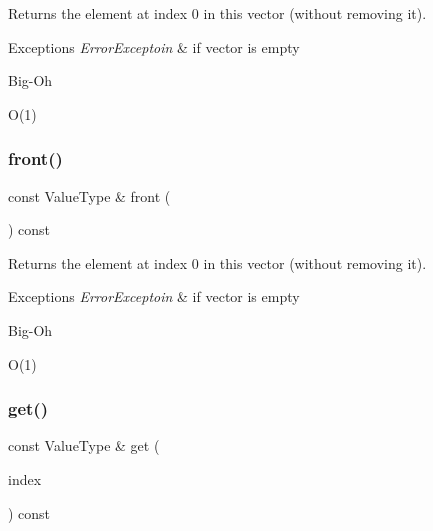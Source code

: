 Returns the element at index 0 in this vector (without removing it). 


\begin{DoxyExceptions}{Exceptions}
{\em Error\+Exceptoin} & if vector is empty \\
\hline
\end{DoxyExceptions}
\begin{DoxyRefDesc}{Big-\/\+Oh}
\item[\mbox{\hyperlink{BigOh__BigOh000112}{Big-\/\+Oh}}]O(1) \end{DoxyRefDesc}
\mbox{\label{classVector_a02aaa52ad7a120201f6dd3e90eff737f}} 
\subsubsection{\texorpdfstring{front()}{front()}\hspace{0.1cm}{\footnotesize\ttfamily [2/2]}}
{\footnotesize\ttfamily const Value\+Type \& front (\begin{DoxyParamCaption}{ }\end{DoxyParamCaption}) const}



Returns the element at index 0 in this vector (without removing it). 


\begin{DoxyExceptions}{Exceptions}
{\em Error\+Exceptoin} & if vector is empty \\
\hline
\end{DoxyExceptions}
\begin{DoxyRefDesc}{Big-\/\+Oh}
\item[\mbox{\hyperlink{BigOh__BigOh000113}{Big-\/\+Oh}}]O(1) \end{DoxyRefDesc}
\mbox{\label{classVector_adcb38df411d14f0bd9c14e23947d2e1c}} 
\subsubsection{\texorpdfstring{get()}{get()}}
{\footnotesize\ttfamily const Value\+Type \& get (\begin{DoxyParamCaption}\item[{int}]{index }\end{DoxyParamCaption}) const}



